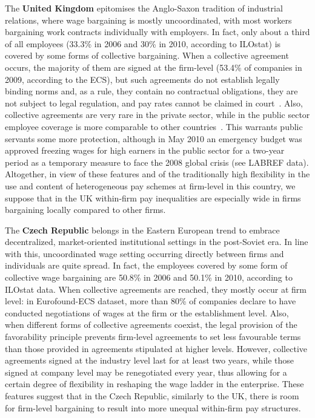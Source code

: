 \documentclass[Review,times,sageh,11pt]{sagej}
\begin{document}
The \textbf{United Kingdom} epitomises the Anglo-Saxon tradition of industrial relations, where wage bargaining is mostly uncoordinated, with most workers bargaining work contracts individually with employers. In fact, only about a third of all employees (33.3\% in 2006 and 30\% in 2010, according to ILOstat) is covered by some forms of collective bargaining. When a collective agreement occurs, the majority of them are signed at the firm-level (53.4\% of companies in 2009, according to the ECS), but such agreements do not establish legally binding norms and, as a rule, they contain no contractual obligations, they are not subject to legal regulation, and pay rates cannot be claimed in court~\citep{visser2013wage}.
Also, collective agreements are very rare in the private sector, while in the public sector employee coverage is more comparable to other countries~\citep{fulton.2013}.
This warrants public servants some more protection, although in May 2010 an emergency budget was approved freezing wages for high earners in the public sector for a two-year period as a temporary measure to face the 2008 global crisis (see LABREF data). Altogether, in view of these features and of the traditionally high flexibility in the use and content of heterogeneous pay schemes at firm-level in this country, we suppose that in the UK within-firm pay inequalities are especially wide in firms bargaining locally compared to other firms.

The \textbf{Czech Republic} belongs in the Eastern European trend to embrace decentralized, market-oriented institutional settings in the post-Soviet era.
In line with this, uncoordinated wage setting occurring directly between firms and individuals are quite spread. In fact, the employees covered by some form of collective wage bargaining are 50.8\% in 2006 and 50.1\% in 2010, according to ILOstat data. When collective agreements are reached, they mostly occur at firm level: in Eurofound-ECS dataset, more than 80\% of companies declare to have conducted negotiations of wages at the firm or the establishment level. Also, when different forms of collective agreements coexist, the legal provision of the favorability principle prevents firm-level agreements to set less favourable terms than those provided in agreements stipulated at higher levels. However, collective agreements signed at the industry level last for at least two years, while those signed at company level may be renegotiated every year, thus allowing for a certain degree of flexibility in reshaping the wage ladder in the enterprise. These features suggest that in the Czech Republic, similarly to the UK, there is room for firm-level bargaining to result into more unequal within-firm pay structures.
\end{document}
